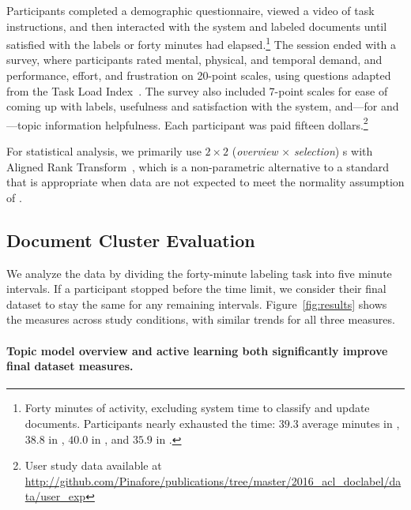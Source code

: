 Participants completed a demographic questionnaire, viewed a video of task
instructions, and then interacted with the system and labeled documents until
satisfied with the labels or forty minutes had elapsed.\footnote{Forty minutes
  of activity, excluding system time to classify and update
  documents. Participants nearly exhausted the time: $39.3$
 average minutes in , $38.8$ in , $40.0$ in , and $35.9$ in
  .} The session ended with a survey, where participants rated mental,
physical, and temporal demand, and performance, effort, and frustration on
20-point scales, using questions adapted from the  Task Load
Index~\cite[]{hart1988development}. The survey also included 7-point
scales for ease of coming up with labels, usefulness and satisfaction with the
system, and---for  and ---topic information helpfulness. Each
participant was paid fifteen dollars.\footnote{User study data available at
\let\hyper@linkurl\saved@hyper@linkurl
  \url{http://github.com/Pinafore/publications/tree/master/2016_acl_doclabel/data/user_exp}
  \NoHyper
  }

For statistical analysis, we primarily use $2\times2$ (\emph{overview} $\times$
\emph{selection}) s with Aligned Rank
Transform~\cite[]{wobbrock2011aligned}, which is a non-parametric
alternative to a standard  that is appropriate when data are not
expected to meet the normality assumption of .
















\subsection{Document Cluster Evaluation}
\label{sub:cluster_results}





We analyze the data by dividing the forty-minute labeling task into
five minute intervals. If a participant stopped before the time
limit, we consider their final dataset to stay the same for any
remaining intervals. Figure~\ref{fig:results} shows the
measures across study conditions, with similar trends for all three
measures.

\paragraph{Topic model overview and active learning both significantly improve final dataset measures.}

